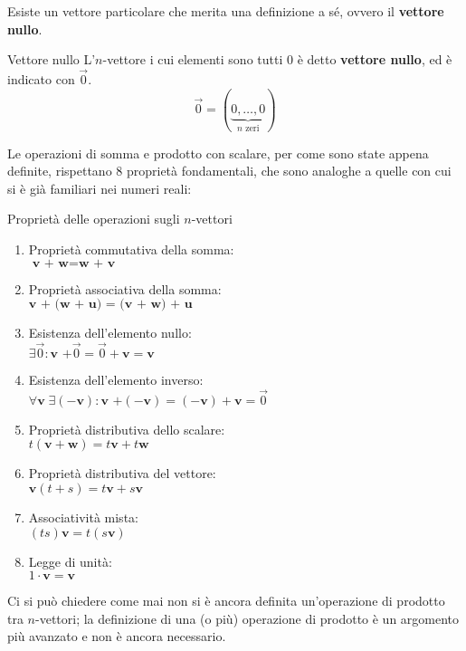 Esiste un vettore particolare che merita una definizione a sé, ovvero il \textbf{vettore nullo}.
\begin{newdef}{Vettore nullo}
    L'$n$-vettore i cui elementi sono tutti 0 è detto \textbf{vettore nullo}, ed è indicato con $\vec 0$.
    \[
        \vec 0 = (\underbrace{0,\dots,0}_\textrm{$n$ zeri})
    \]
\end{newdef}
Le operazioni di somma e prodotto con scalare, per come sono state appena definite, rispettano 8 proprietà fondamentali, che sono analoghe a quelle con cui si è già familiari nei numeri reali:
\begin{teo}{Proprietà delle operazioni sugli $n$-vettori}
    \begin{enumerate}
        \item Proprietà commutativa della somma: \\
              $\textbf{v + w} = \textbf{w + v}$

        \item Proprietà associativa della somma: \\
              $\textbf{v + (w + u) = (v + w) + u}$

        \item Esistenza dell'elemento nullo: \\
              $\exists \vec 0 : \textbf{v +} \vec 0 = \vec 0 + \textbf{v} = \textbf{v}$

        \item Esistenza dell'elemento inverso: \\
              $\forall \textbf{v} \; \exists (-\textbf{v}) : \textbf{v +}(-\textbf{v}) = (-\textbf{v}) + \textbf{v} = \vec 0$

        \item Proprietà distributiva dello scalare: \\
              $t(\textbf{v} + \textbf{w}) = t\textbf{v} + t\textbf{w}$

        \item Proprietà distributiva del vettore: \\
              $\textbf{v}(t + s) = t\textbf{v} + s\textbf{v}$

        \item Associatività mista: \\
              $(ts)\textbf{v} = t(s\textbf{v})$

        \item Legge di unità: \\
              $1 \cdot \textbf{v} = \textbf{v}$
    \end{enumerate}
\end{teo}
Ci si può chiedere come mai non si è ancora definita un'operazione di prodotto tra $n$-vettori; la definizione di una (o più) operazione di prodotto è un argomento più avanzato e non è ancora necessario.

